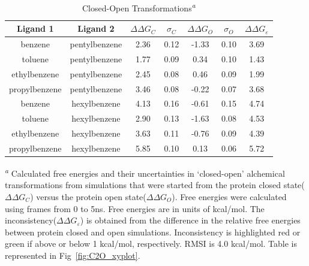 \begin{table}[!htb]
\centering
\caption{Closed-Open Transformations\textsuperscript{\emph{a}}}
\label{tbl:C-O}
\begin{tabular}{|c|c|c|c|c|c|c|}
\hline
\textbf{Ligand 1}       & \textbf{Ligand 2}    & \boldmath$\Delta\Delta G_{C}$ & \boldmath$\sigma_{C}$ & \boldmath$\Delta\Delta G_{O}$ & \boldmath$\sigma_{O}$ & \boldmath$\Delta\Delta G_{\varepsilon}$ \\ \hline
benzene         & pentylbenzene & 2.36       & 0.12  & -1.33  & 0.10  & \cellcolor[HTML]{FFCCC9}3.69 \\ \hline
toluene         & pentylbenzene & 1.77       & 0.09  & 0.34   & 0.10  & \cellcolor[HTML]{FFCCC9}1.43 \\ \hline
ethylbenzene    & pentylbenzene & 2.45       & 0.08  & 0.46   & 0.09  & \cellcolor[HTML]{FFCCC9}1.99 \\ \hline
propylbenzene & pentylbenzene & 3.46       & 0.08  & -0.22  & 0.07  & \cellcolor[HTML]{FFCCC9}3.68 \\ \hline
benzene         & hexylbenzene  & 4.13       & 0.16  & -0.61  & 0.15  & \cellcolor[HTML]{FFCCC9}4.74 \\ \hline
toluene         & hexylbenzene  & 2.90       & 0.13  & -1.63  & 0.08  & \cellcolor[HTML]{FFCCC9}4.53 \\ \hline
ethylbenzene    & hexylbenzene  & 3.63       & 0.11  & -0.76  & 0.09  & \cellcolor[HTML]{FFCCC9}4.39 \\ \hline
propylbenzene & hexylbenzene  & 5.85       & 0.10  & 0.13   & 0.06  & \cellcolor[HTML]{FFCCC9}5.72 \\ \hline
\end{tabular}

\textsuperscript{\emph{a}} Calculated free energies and their uncertainties in `closed-open' alchemical transformations from simulations that were started from the protein closed state(\boldmath$\Delta\Delta G_{C}$) versus the protein open state(\boldmath$\Delta\Delta G_{O}$).
Free energies were calculated using frames from 0 to 5ns.  
Free energies are in units of kcal/mol. 
The inconsistency(\boldmath$\Delta\Delta G_{\varepsilon}$) is obtained from the difference in the relative free energies between protein closed and open simulations. 
Inconsistency is highlighted red or green if above or below 1 kcal/mol, respectively.
RMSI is 4.0 kcal/mol.
Table is represented in Fig~\ref{fig:C2O_xyplot}.
\end{table}


